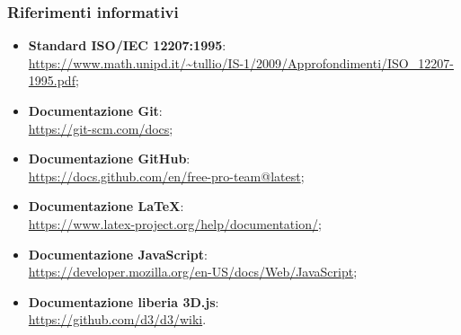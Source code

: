 \documentclass[../norme_di_progetto.tex]{subfiles}
\begin{document}
\subsubsection{Riferimenti informativi}
\begin{itemize}
    \item \textbf{Standard ISO/IEC 12207:1995}: \\
    \url{https://www.math.unipd.it/~tullio/IS-1/2009/Approfondimenti/ISO_12207-1995.pdf};
    \item \textbf{Documentazione Git}: \\
    \url{https://git-scm.com/docs};
    \item \textbf{Documentazione GitHub}: \\
    \url{https://docs.github.com/en/free-pro-team@latest};
    \item \textbf{Documentazione LaTeX}: \\
    \url{https://www.latex-project.org/help/documentation/};
    \item \textbf{Documentazione JavaScript}: \\
    \url{https://developer.mozilla.org/en-US/docs/Web/JavaScript};
    \item \textbf{Documentazione liberia 3D.js}: \\
    \url{https://github.com/d3/d3/wiki}.

\end{itemize}
\end{document}
